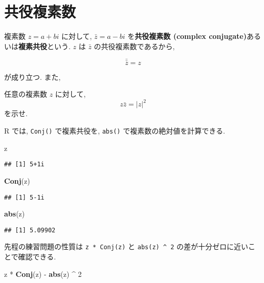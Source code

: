 \documentclass[a4paper]{scrbook}
\newenvironment{Shaded}{\begin{snugshade}}{\end{snugshade}}
\newcommand{\KeywordTok}[1]{\textcolor[rgb]{0.13,0.29,0.53}{\textbf{{#1}}}}
\newcommand{\DecValTok}[1]{\textcolor[rgb]{0.00,0.00,0.81}{{#1}}}
\newcommand{\StringTok}[1]{\textcolor[rgb]{0.31,0.60,0.02}{{#1}}}
\newcommand{\NormalTok}[1]{{#1}}
\theoremstyle{definition}
\let\BeginKnitrBlock\begin \let\EndKnitrBlock\end
\begin{document}
\section{共役複素数}

複素数 \(z = a + bi\) に対して, \(\bar z = a - bi\) を\textbf{共役複素数
(complex conjugate)}あるいは\textbf{複素共役}という. \(z\) は \(\bar z\)
の共役複素数であるから,

\begin{equation*}
  \bar{\bar z} = z 
\end{equation*}

が成り立つ. また, \BeginKnitrBlock{exercise}

任意の複素数 \(z\) に対して, \[
  z\bar z = |z|^2
\] を示せ.
\EndKnitrBlock{exercise}

R では, \texttt{Conj()} で複素共役を, \texttt{abs()}
で複素数の絶対値を計算できる.

\begin{Shaded}
\begin{Highlighting}[]
\NormalTok{z}
\end{Highlighting}
\end{Shaded}

\begin{verbatim}
## [1] 5+1i
\end{verbatim}

\begin{Shaded}
\begin{Highlighting}[]
\KeywordTok{Conj}\NormalTok{(z)}
\end{Highlighting}
\end{Shaded}

\begin{verbatim}
## [1] 5-1i
\end{verbatim}

\begin{Shaded}
\begin{Highlighting}[]
\KeywordTok{abs}\NormalTok{(z)}
\end{Highlighting}
\end{Shaded}

\begin{verbatim}
## [1] 5.09902
\end{verbatim}

先程の練習問題の性質は \texttt{z\ *\ Conj(z)} と
\texttt{abs(z)\ \^{}\ 2} の差が十分ゼロに近いことで確認できる.

\begin{Shaded}
\begin{Highlighting}[]
\NormalTok{z *}\StringTok{ }\KeywordTok{Conj}\NormalTok{(z) -}\StringTok{ }\KeywordTok{abs}\NormalTok{(z) ^}\StringTok{ }\DecValTok{2}
\end{Highlighting}
\end{Shaded}
\end{document}
